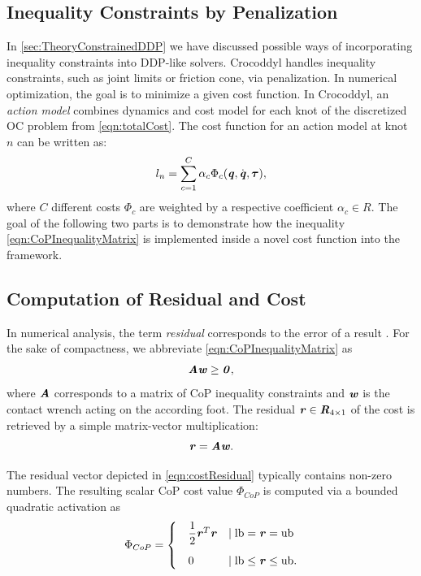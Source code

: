 \subsection{Inequality Constraints by Penalization}
In \cref{sec:TheoryConstrainedDDP} we have discussed possible ways of incorporating inequality constraints into DDP-like solvers. Crocoddyl handles inequality constraints, such as joint limits or friction cone, via penalization. 
In numerical optimization, the goal is to minimize a given cost function. In Crocoddyl, an \textit{action model} combines dynamics and cost model for each knot of the discretized \gls{OC} problem from \cref{eqn:totalCost}. The cost function for an action model at knot $n$ can be written as: 
\begin{equation}\label{eqn:costSum}
l_n=\sum_{c=1}^{C}\alpha_c\Phi_c(\bm{\mathit{q}},\dot{\bm{\mathit{q}}}, \bm{\mathit{\tau}}), 
\end{equation}
where $C$ different costs $\Phi_c$ are weighted by a respective coefficient $\alpha_c\in R$. The goal of the following two parts is to demonstrate how the inequality \cref{eqn:CoPInequalityMatrix} is implemented inside a novel cost function into the framework.

\subsection{Computation of Residual and Cost}
In numerical analysis, the term \textit{residual} corresponds to the error of a result \cite{shewchuk1994introduction}. For the sake of compactness, we abbreviate \cref{eqn:CoPInequalityMatrix} as 
\begin{equation} \label{eqn:costPositive}
\bm{\mathit{A}} \bm{\mathit{w}} \geq \bm{\mathit{0}},
\end{equation}
where $\bm{\mathit{A}}$ corresponds to a matrix of \gls{CoP} inequality constraints and $\bm{\mathit{w}}$ is the contact wrench acting on the according foot. The residual $\bm{\mathit{r}}\in \bm{\mathit{R}}_{4\times 1}$ of the cost is retrieved by a simple matrix-vector multiplication:
\begin{equation}\label{eqn:costResidual}
\bm{\mathit{r}} = \bm{\mathit{A}} \bm{\mathit{w}}.
\end{equation} 

The residual vector depicted in \cref{eqn:costResidual} typically contains non-zero numbers. The resulting scalar \gls{CoP} cost value $\Phi_{CoP}$ is computed via a bounded quadratic activation as
\begin{equation}\label{eqn:CoPCostComputation}
\Phi_{CoP}=
\begin{cases}
\quad\dfrac{1}{2}\bm{\mathit{r}}^T\bm{\mathit{r}} &\mid \text{lb} = \bm{\mathit{r}} = \text{ub} \\[10pt]
\quad 0 &\mid \text{lb} \leq \bm{\mathit{r}} \leq \text{ub}.
\end{cases}
\end{equation}

